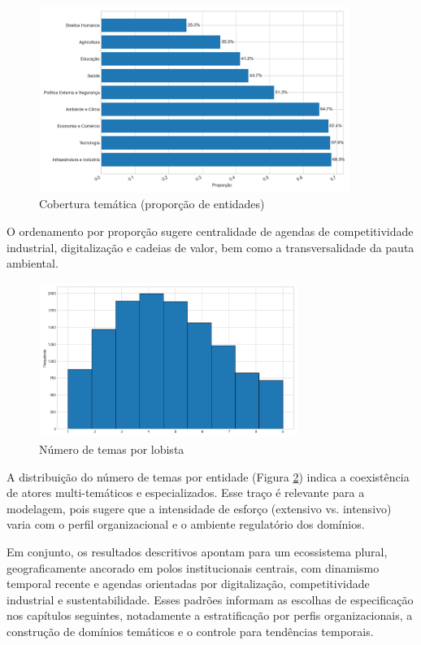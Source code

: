 \begin{figure}[!htbp]
\centering
\includegraphics[width=0.9\textwidth]{figures/theme_coverage.png}
\caption{Cobertura temática (proporção de entidades)}
\label{fig:theme_coverage}
\end{figure}

O ordenamento por proporção sugere centralidade de agendas de competitividade industrial, digitalização e cadeias de valor, bem como a transversalidade da pauta ambiental.


\begin{figure}[!htbp]
\centering
\includegraphics[width=0.75\textwidth]{figures/themes_per_lobbyist_hist.png}
\caption{Número de temas por lobista}
\label{fig:themes_per_lobbyist_hist}
\end{figure}

A distribuição do número de temas por entidade (Figura \ref{fig:themes_per_lobbyist_hist}) indica a coexistência de atores multi-temáticos e especializados. Esse traço é relevante para a modelagem, pois sugere que a intensidade de esforço (extensivo vs. intensivo) varia com o perfil organizacional e o ambiente regulatório dos domínios.




Em conjunto, os resultados descritivos apontam para um ecossistema plural, geograficamente ancorado em polos institucionais centrais, com dinamismo temporal recente e agendas orientadas por digitalização, competitividade industrial e sustentabilidade. Esses padrões informam as escolhas de especificação nos capítulos seguintes, notadamente a estratificação por perfis organizacionais, a construção de domínios temáticos e o controle para tendências temporais.


